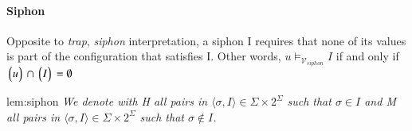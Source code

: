 \paragraph*{Siphon}
Opposite to \textit{trap}, \textit{siphon} interpretation, 
a siphon I requires that none of its values is part of the configuration
that satisfies I. 
Other words, $u \models_{\mathcal{V}_{siphon}} I$ if and only if  $\left\lgroup u \right\rgroup \cap \left\lgroup I \right\rgroup = \emptyset$
\begin{lem}{lem:siphon}
    \textit{We denote with H all pairs in $\langle \sigma, I \rangle \in \Sigma \times 2^{\Sigma}$
    such that  $\sigma \in I$ and M all pairs in $\langle \sigma, I \rangle \in \Sigma \times 2^{\Sigma}$
    such that  $\sigma \notin I$.}

\end{lem}

